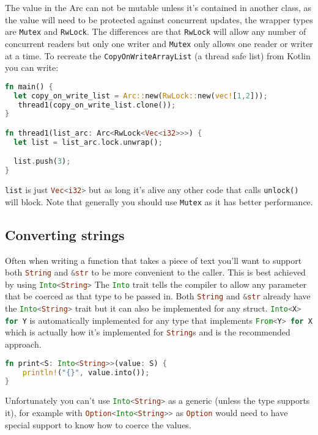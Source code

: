 \documentclass[a4paper,11pt]{article}
\begin{document}
The value in the Arc can not be mutable unless it's contained in another class, as the value will need to be protected against concurrent updates, the wrapper types are \lstinline[language=Rust]{Mutex} and \lstinline[language=Rust]{RwLock}. The differences are that \lstinline[language=Rust]{RwLock} will allow any number of concurrent readers but only one writer and \lstinline[language=Rust]{Mutex} only allows one reader or writer at a time. To recreate the \lstinline[language=Rust]{CopyOnWriteArrayList} (a thread safe list) from Kotlin you can write:
 \begin{lstlisting}[language=Rust,frame=single]
fn main() {
  let copy_on_write_list = Arc::new(RwLock::new(vec![1,2]));
   thread1(copy_on_write_list.clone());
}

fn thread1(list_arc: Arc<RwLock<Vec<i32>>>) {
  let list = list_arc.lock.unwrap();

  list.push(3);
}
\end{lstlisting}

\lstinline{list} is just \lstinline[language=Rust]{Vec<i32>} but as long it's alive any other code that calls \lstinline[language=Rust]{unlock()} will block.
\newline
Note that generally you should use \lstinline[language=Rust]{Mutex} as it has better performance.
\medskip
\medskip
\newline
\subsection{Converting strings}

Often when writing a function that takes a piece of text you'll want to support both \lstinline[language=Rust]{String} and \lstinline[language=Rust]{&str} to be more convenient to the caller. This is best achieved by using \lstinline[language=Rust]{Into<String>}
The \lstinline[language=Rust]{Into} trait tells the compiler to allow any parameter that be coerced as that type to be passed in. Both \lstinline[language=Rust]{String} and \lstinline[language=Rust]{&str} already have the \lstinline[language=Rust]{Into<String>} trait but it can also be implemented for any struct. \lstinline[language=Rust]{Into<X> for Y} is automatically implemented for any type that implements \lstinline[language=Rust]{From<Y> for X} which is actually how it's implemented for \lstinline[language=Rust]{String}s and is the recommended approach.
\begin{lstlisting}[language=Rust,frame=single]
fn print<S: Into<String>>(value: S) {
    println!("{}", value.into());
}
\end{lstlisting}
Unfortunately you can't use \lstinline[language=Rust]{Into<String>} as a generic (unless the type supports it), for example with \lstinline[language=Rust]{Option<Into<String>>} as \lstinline[language=Rust]{Option} would need to have special support to know how to coerce the values.
\medskip
\medskip
\newline
\end{document}
